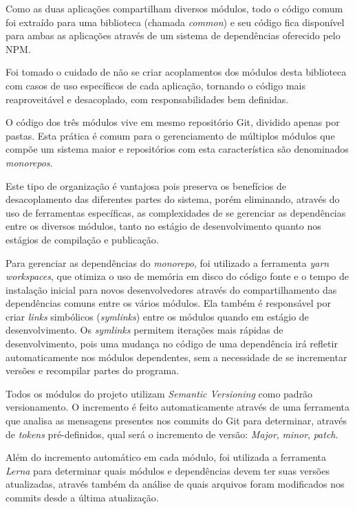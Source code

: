             Como as duas aplicações compartilham diversos módulos, todo o código comum foi extraído para uma biblioteca (chamada \textit{common}) e seu código fica disponível para ambas as aplicações através de um sistema de dependências oferecido pelo NPM.
    
            Foi tomado o cuidado de não se criar acoplamentos dos módulos desta biblioteca com casos de uso específicos de cada aplicação, tornando o código mais reaproveitável e desacoplado, com responsabilidades bem definidas.
    
            O código dos três módulos vive em mesmo repositório Git, dividido apenas por pastas. Esta prática é comum para o gerenciamento de múltiplos módulos que compõe um sistema maior e  repositórios com esta característica são denominados \textit{monorepos}.
    
            Este tipo de organização é vantajosa pois preserva os benefícios de desacoplamento das diferentes partes do sistema, porém eliminando, através do uso de ferramentas específicas, as complexidades de se gerenciar as dependências entre os diversos módulos, tanto no estágio de desenvolvimento quanto nos estágios de compilação e publicação.
    
            Para gerenciar as dependências do \textit{monorepo}, foi utilizado a ferramenta \textit{yarn workspaces}, que otimiza o uso de memória em disco do código fonte e o tempo de instalação inicial para novos desenvolvedores através do compartilhamento das dependências comuns entre os vários módulos. Ela também é responsável por criar \textit{links} simbólicos (\textit{symlinks}) entre os módulos quando em estágio de desenvolvimento. Os \textit{symlinks} permitem iterações mais rápidas de desenvolvimento, pois uma mudança no código de uma dependência irá refletir automaticamente nos módulos dependentes, sem a necessidade de se incrementar versões e recompilar partes do programa.
    
            Todos os módulos do projeto utilizam \textit{Semantic Versioning} como padrão versionamento. O incremento é feito automaticamente através de uma ferramenta que analisa as mensagens presentes nos commits do Git para determinar, através de \textit{tokens} pré-definidos, qual será o incremento de versão: \textit{Major}, \textit{minor}, \textit{patch}.
    
            Além do incremento automático em cada módulo, foi utilizada a ferramenta \textit{Lerna} para determinar quais módulos e dependências devem ter suas versões atualizadas, através também da análise de quais arquivos foram modificados nos commits desde a última atualização.
    
